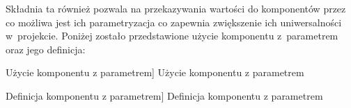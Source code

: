 \documentclass[../Kamil_Kowalewski_Main.tex]{subfiles}
\begin{document}
{{{            Składnia ta również pozwala na przekazywania wartości do komponentów przez
            co możliwa jest ich parametryzacja co zapewnia zwiększenie ich
            uniwersalności w~projekcie. Poniżej zostało przedstawione użycie komponentu
            z~parametrem oraz jego definicja:
            \begin{code}[H]
                
                \caption
                [Użycie komponentu z parametrem]
                {Użycie komponentu z parametrem}
                \label{chapter3:technologie:react:jsx:props_usage}
            \end{code}

            \begin{code}[H]
                
                \caption
                [Definicja komponentu z parametrem]
                {Definicja komponentu z parametrem}
                \label{chapter3:technologie:react:jsx:props_def}
            \end{code}

        }

}}
\end{document}
